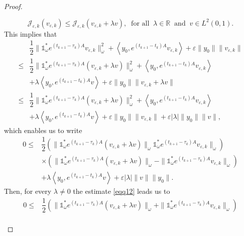 \documentclass[10pt,a4paper]{amsart}
\begin{document}
\begin{proof}
\begin{enumerate}
    \[\mathcal{J}_{\varepsilon,k}(v_{\varepsilon,k}) \leq \mathcal{J}_{\varepsilon,k}(v_{\varepsilon,k}+ \lambda v), \;\;\text{for all}\;\;\lambda\in \mathbb{R}\;\;\text{and}\;\;v\in L^2(0,1).\]
    This implies that
    \begin{align*}
        &\dfrac{1}{2} \| \mathds{1}_{\omega}^{*} e^{(t_{k+1}-\tau_k)A} v_{\varepsilon,k}\|^2_{\omega} + \left\langle y_0, e^{(t_{k+1}-t_k)A} v_{\varepsilon,k} \right\rangle + \varepsilon \|y_0\|\| v_{\varepsilon,k}\|\\
        \leq &\dfrac{1}{2} \| \mathds{1}_{\omega}^{*} e^{(t_{k+1}-\tau_k)A} (v_{\varepsilon,k} + \lambda v) \|^2_{\omega} + \left\langle y_0, e^{(t_{k+1}-t_k)A} v_{\varepsilon,k} \right\rangle \\
        &+ \lambda \left\langle y_0, e^{(t_{k+1}-t_k)A} v \right\rangle + \varepsilon \|y_0\|\| v_{\varepsilon,k} + \lambda v\|\\
        \leq &\dfrac{1}{2} \| \mathds{1}_{\omega}^{*} e^{(t_{k+1}-\tau_k)A} (v_{\varepsilon,k} + \lambda v) \|^2_{\omega} + \left\langle y_0, e^{(t_{k+1}-t_k)A} v_{\varepsilon,k} \right\rangle \\
        &+ \lambda \left\langle y_0, e^{(t_{k+1}-t_k)A} v \right\rangle + \varepsilon \|y_0\|\| v_{\varepsilon,k}\| + \varepsilon \left\lvert \lambda \right\rvert \|y_0\| \|v\|,
    \end{align*}
    which enables us to write
    \begin{equation}\label{eqq12}
        \begin{aligned}
        0\leq &\dfrac{1}{2} \left(\| \mathds{1}_{\omega}^{*} e^{(t_{k+1}-\tau_k)A} (v_{\varepsilon,k}+\lambda v)\|_{\omega} \mathds{1}_{\omega}^{*} e^{(t_{k+1}-\tau_k)A} v_{\varepsilon,k}\|_{\omega} \right)\nonumber\\
        &\times \left(\| \mathds{1}_{\omega}^{*} e^{(t_{k+1}-\tau_k)A} (v_{\varepsilon,k}+\lambda v)\|_{\omega} - \| \mathds{1}_{\omega}^{*} e^{(t_{k+1}-\tau_k)A} v_{\varepsilon,k}\|_{\omega}  \right)\nonumber\\
        &+ \lambda \left\langle y_0, e^{(t_{k+1}-t_k)A} v \right\rangle +  \varepsilon \left\lvert\lambda \right\rvert \|v\| \|y_0\|.
    \end{aligned}
    \end{equation}
    Then, for every $\lambda \neq 0$ the estimate \eqref{eqq12} leads us to
    \begin{align*}
        0\leq &\dfrac{1}{2} \left(\| \mathds{1}_{\omega}^{*} e^{(t_{k+1}-\tau_k)A} (v_{\varepsilon,k}+\lambda v)\|_{\omega} + \| \mathds{1}_{\omega}^{*} e^{(t_{k+1}-\tau_k)A} v_{\varepsilon,k}\|_{\omega} \right)\nonumber\\

\end{align*}
\end{enumerate}
\end{proof}
\end{document}
